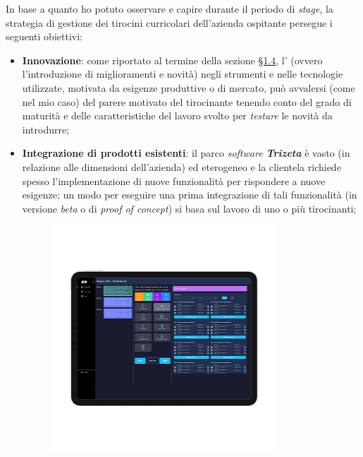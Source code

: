 In base a quanto ho potuto osservare e capire durante il periodo di \textit{stage}, la strategia di gestione dei tirocini curricolari dell'azienda ospitante persegue i seguenti obiettivi:
\begin{itemize}
    \item \textbf{Innovazione}: come riportato al termine della sezione \hyperref[sec:innovazione]{§1.4}, l' (ovvero l'introduzione di miglioramenti e novità) negli strumenti e nelle tecnologie utilizzate, motivata da esigenze produttive o di mercato,
    può avvalersi (come nel mio caso) del parere motivato del tirocinante tenendo conto del grado di maturità e delle caratteristiche del lavoro svolto per \textit{testare} le novità da introdurre;
    \item \textbf{Integrazione di prodotti esistenti}: il parco \textit{software \textbf{Trizeta}} è vasto (in relazione alle dimensioni dell'azienda) ed eterogeneo e la clientela richiede spesso l'implementazione di nuove funzionalità per rispondere a nuove esigenze; un modo per eseguire
        una prima integrazione di tali funzionalità (in versione \textit{beta} o di \textit{proof of concept}) si basa sul lavoro di uno o più tirocinanti;
        \vspace{-20mm}
        \begin{figure}[H]
            \centering
            \includegraphics[width=0.8\textwidth]{images/ademes.png}

\end{figure}
\end{itemize}
